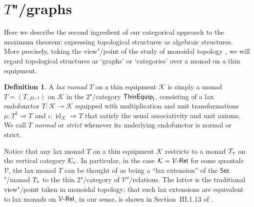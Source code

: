 \documentclass[preprint, a4paper]{elsarticle}
\theoremstyle{definition}
\newtheorem{definition}[theorem]{Definition}
\theoremstyle{remark}
\providecommand{\natarrow}{\Rightarrow}
\providecommand{\map}[3]{#1\colon#2\to#3}
\providecommand{\nat}[3]{#1\colon#2\natarrow#3}
\DeclareMathOperator{\id}{id}
\providecommand{\catvar}[1]{\mathcal{#1}}
\providecommand{\2}{\mathsf 2}
\providecommand{\K}{\catvar K}
\providecommand{\V}{\catvar V}
\providecommand{\Set}{\mathsf{Set}}
\providecommand{\ThinEq}{\mathsf{ThinEquip}}
\providecommand{\lThinEq}{\ThinEq_\textup l}
\providecommand{\Rel}{\mathsf{Rel}}
\providecommand{\enRel}[1]{#1\text-\Rel}
\begin{document}
  \section{\texorpdfstring{$T$"/}{T-}graphs} \label{T-graphs}
  Here we describe the second ingredient of our categorical approach to the maximum theorem: expressing topological structures as algebraic structures. More precisely, taking the view"/point of the study of monoidal topology \cite{Hofmann-Seal-Tholen14}, we will regard topological structures as `graphs' or `categories' over a monad on a thin equipment.
  
  \begin{definition}
  	A \emph{lax monad} $T$ on a thin equipment $\K$ is simply a monad $T = (T, \mu, \iota)$ on $\K$ in the $2$"/category $\lThinEq$, consisting of a lax endofunctor $\map T\K\K$ equipped with multiplication and unit transformations $\nat\mu{T^2}T$ and $\nat\iota{\id_\K}T$ that satisfy the usual associativity and unit axioms. We call $T$ \emph{normal} or \emph{strict} whenever its underlying endofunctor is normal or strict.
  \end{definition}
  Notice that any lax monad $T$ on a thin equipment $\K$ restricts to a monad $T_\textup v$ on the vertical category $\K_\textup v$. In particular, in the case $\K = \enRel\V$ for some quantale $\V$, the lax monad $T$ can be thought of as being a ``lax extension'' of the $\Set$"/monad $T_\textup v$ to the thin $2$"/category of $\V$"/relations. The latter is the traditional view"/point taken in monoidal topology; that such lax extensions are equivalent to lax monads on $\enRel\V$, in our sense, is shown in Section~III.1.13 of \cite{Hofmann-Seal-Tholen14}.
  
\end{document}
